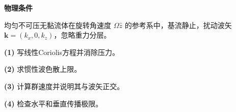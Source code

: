 \textbf{物理条件}\par 均匀不可压无黏流体在旋转角速度 \(\Omega\hat z\) 的参考系中，基流静止，扰动波矢 \(\boldsymbol k=(k_x,0,k_z)\)，忽略重力分层。
\par\noindent\textbf{(1)} 写线性Coriolis方程并消除压力。
\par\noindent\textbf{(2)} 求惯性波色散上限。
\par\noindent\textbf{(3)} 计算群速度并说明其与波矢正交。
\par\noindent\textbf{(4)} 检查水平和垂直传播极限。
